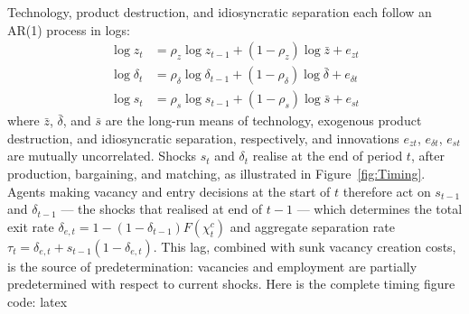 \documentclass[authoryear, review, 12pt]{elsarticle}
\begin{document}
	Technology, product destruction, and idiosyncratic separation each 
	follow an AR(1) process in logs:
	\begin{align}
		\log z_t &= \rho_z \log z_{t-1} + (1-\rho_z)\log\bar{z} + 
		e_{zt} \label{eq:ar1_z}\\
		\log \delta_t &= \rho_\delta \log \delta_{t-1} + 
		(1-\rho_\delta)\log\bar{\delta} + e_{\delta t} \label{eq:ar1_delta}\\
		\log s_t &= \rho_s \log s_{t-1} + 
		(1-\rho_s)\log\bar{s} + e_{st} \label{eq:ar1_s}
	\end{align}
	where $\bar{z}$, $\bar{\delta}$, and $\bar{s}$ are the long-run 
	means of technology, exogenous product destruction, and 
	idiosyncratic separation, respectively, and innovations 
	$e_{zt}$, $e_{\delta t}$, $e_{st}$ are mutually uncorrelated. 
	Shocks $s_t$ and $\delta_t$ realise at the end of period $t$, 
	after production, bargaining, and matching, as illustrated in 
	Figure~\ref{fig:Timing}. Agents making vacancy and entry decisions 
	at the start of $t$ therefore act on $s_{t-1}$ and 
	$\delta_{t-1}$ --- the shocks that realised at end of $t-1$ --- 
	which determines the total exit rate 
	$\delta_{e,t}=1-(1-\delta_{t-1})F(\chi_t^c)$ and aggregate 
	separation rate $\tau_t=\delta_{e,t}+s_{t-1}(1-\delta_{e,t})$. 
	This lag, combined with sunk vacancy creation costs, is the 
	source of predetermination: vacancies and employment are 
	partially predetermined with respect to current shocks.
	Here is the complete timing figure code:
	latex\tikzset{>=latex}
\end{document}

